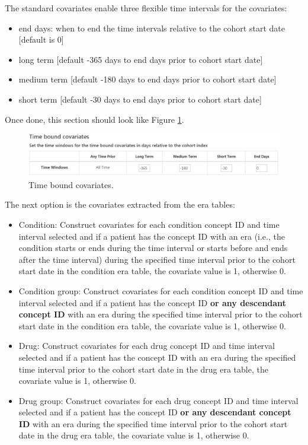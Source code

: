 \documentclass[11pt]{book}
\providecommand{\tightlist}{%
  \setlength{\itemsep}{0pt}\setlength{\parskip}{0pt}}
\theoremstyle{definition}
\theoremstyle{definition}
\theoremstyle{definition}
\theoremstyle{remark}
\begin{document}
The standard covariates enable three flexible time intervals for the covariates:

\begin{itemize}
\tightlist
\item
  end days: when to end the time intervals relative to the cohort start date {[}default is 0{]}
\item
  long term {[}default -365 days to end days prior to cohort start date{]}
\item
  medium term {[}default -180 days to end days prior to cohort start date{]}
\item
  short term {[}default -30 days to end days prior to cohort start date{]}
\end{itemize}

Once done, this section should look like Figure \ref{fig:covariateSettings3}.

\begin{figure}

{\centering \includegraphics[width=1\linewidth]{images/PatientLevelPrediction/covariateSettings3} 

}

\caption{Time bound covariates.}\label{fig:covariateSettings3}
\end{figure}

The next option is the covariates extracted from the era tables:

\begin{itemize}
\tightlist
\item
  Condition: Construct covariates for each condition concept ID and time interval selected and if a patient has the concept ID with an era (i.e., the condition starts or ends during the time interval or starts before and ends after the time interval) during the specified time interval prior to the cohort start date in the condition era table, the covariate value is 1, otherwise 0.
\item
  Condition group: Construct covariates for each condition concept ID and time interval selected and if a patient has the concept ID \textbf{or any descendant concept ID} with an era during the specified time interval prior to the cohort start date in the condition era table, the covariate value is 1, otherwise 0.
\item
  Drug: Construct covariates for each drug concept ID and time interval selected and if a patient has the concept ID with an era during the specified time interval prior to the cohort start date in the drug era table, the covariate value is 1, otherwise 0.
\item
  Drug group: Construct covariates for each drug concept ID and time interval selected and if a patient has the concept ID \textbf{or any descendant concept ID} with an era during the specified time interval prior to the cohort start date in the drug era table, the covariate value is 1, otherwise 0.
\end{itemize}
\end{document}
